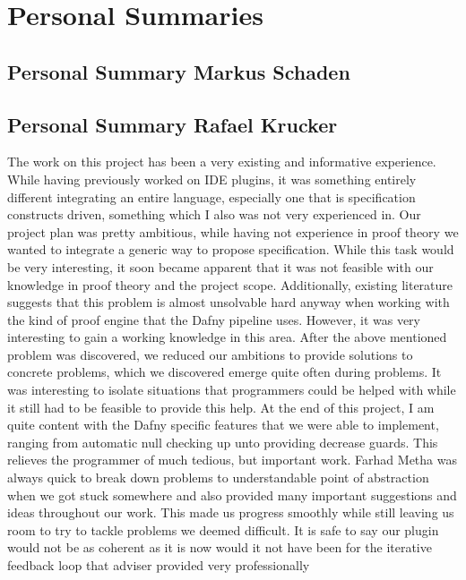 \section{Personal Summaries}

\subsection{Personal Summary Markus Schaden}

\subsection{Personal Summary Rafael Krucker}
The work on this project has been a very existing and informative experience. While having previously worked on IDE plugins, it was something entirely different integrating an entire language, especially one that is specification constructs driven, something which I also was not very experienced in. \newline
Our project plan was pretty ambitious, while having not experience in proof theory we wanted to integrate a generic way to propose specification. While this task would be very interesting, it soon became apparent that it was not feasible with our knowledge in proof theory and the project scope. Additionally, existing literature suggests that this problem is almost unsolvable hard anyway when working with the kind of proof engine that the Dafny pipeline uses. However, it was very interesting to gain a working knowledge in this area. \newline
After the above mentioned problem was discovered, we reduced our ambitions to provide solutions to concrete problems, which we discovered emerge quite often during problems. It was interesting to isolate situations that programmers could be helped with while it still had to be feasible to provide this help. At the end of this project, I am quite content with the Dafny specific features that we were able to implement, ranging from automatic null checking up unto providing decrease guards. This relieves the programmer of much tedious, but important work. \newline
Farhad Metha was always quick to break down problems to understandable point of abstraction when we got stuck somewhere and also provided many important suggestions and ideas throughout our work. This made us progress smoothly while still leaving us room to try to tackle problems we deemed difficult. It is safe to say our plugin would not be as coherent as it is now would it not have been for the iterative feedback loop that adviser provided very professionally \newline
